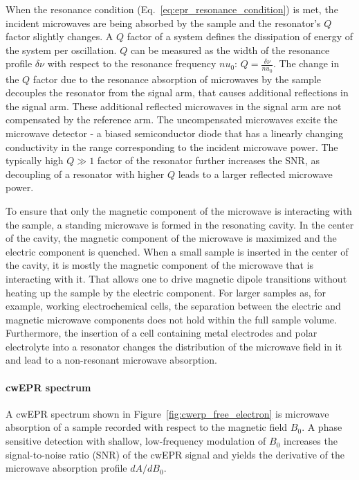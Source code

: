 \par
When the resonance condition (Eq.~\ref{eq:epr_resonance_condition}) is met, the incident microwaves are being absorbed by the sample and the resonator's $Q$ factor slightly changes. A $Q$ factor of a system defines the dissipation of energy of the system per oscillation. $Q$ can be measured as the width of the resonance profile $\delta\nu$ with respect to the resonance frequency $nu_0$: $Q=\frac{\delta\nu}{nu_0}$. The change in the $Q$ factor due to the resonance absorption of microwaves by the sample decouples the resonator from the signal arm, that causes additional reflections in the signal arm. These additional reflected microwaves in the signal arm are not compensated by the reference arm. The uncompensated microwaves excite the microwave detector - a biased semiconductor diode that has a linearly changing conductivity in the range corresponding to the incident microwave power. The typically high $Q\gg1$ factor of the resonator further increases the SNR, as decoupling of a resonator with higher $Q$ leads to a larger reflected microwave power.

\par
To ensure that only the magnetic component of the microwave is interacting with the sample, a standing microwave is formed in the resonating cavity. In the center of the cavity, the magnetic component of the microwave is maximized and the electric component is quenched. When a small sample is inserted in the center of the cavity, it is mostly the magnetic component of the microwave that is interacting with it. That allows one to drive magnetic dipole transitions without heating up the sample by the electric component. For larger samples as, for example, working electrochemical cells, the separation between the electric and magnetic microwave components does not hold within the full sample volume. Furthermore, the insertion of a cell containing metal electrodes and polar electrolyte into a resonator changes the distribution of the microwave field in it and lead to a non-resonant microwave absorption.

\paragraph{cwEPR spectrum}
A cwEPR spectrum shown in Figure~\ref{fig:cwerp_free_electron} is microwave absorption of a sample recorded with respect to the magnetic field $B_0$. A phase sensitive detection with shallow, low-frequency modulation of $B_0$ increases the signal-to-noise ratio (SNR) of the cwEPR signal and yields the derivative of the microwave absorption profile $dA/dB_0$.



